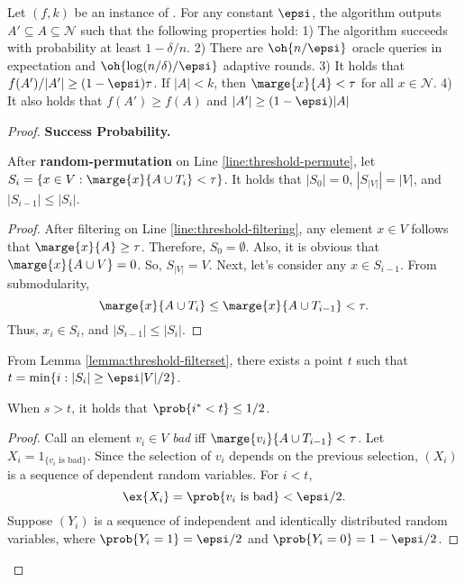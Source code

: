 \begin{theorem} \label{thm:threshold}
Let $(f,k)$ be an instance of \sm . For any constant $\epsi$, 
the algorithm \threshold outputs $A'\subseteq A \subseteq \mathcal{N}$ such that the following properties hold:
1) The algorithm succeeds with probability at least $1 - \delta/n$.
2) There are $\oh{n/\epsi}$ oracle queries in expectation and $\oh{\log (n/\delta)/\epsi}$ adaptive rounds.
3) It holds that $f(A')/|A'| \ge (1-\epsi) \tau$.
If $|A| < k$, then $\marge{x}{A} < \tau$ for all $x\in \mathcal{N}$.
4) It also holds that $f(A')\ge f(A)$ and $|A'|\ge (1-\epsi)|A|$
\end{theorem}
\begin{proof}
\textbf{Success Probability.}
\begin{lemma} \label{lemma:threshold-filterset}
	After \textbf{random-permutation} on Line \ref{line:threshold-permute},
	let $S_i=\{x \in V: \marge{x}{A\cup T_i} < \tau\}$.
	It holds that $|S_0|=0$, $|S_{|V|}|=|V|$, and $|S_{i-1}| \le |S_i|$.
\end{lemma}
\begin{proof}
	After filtering on Line \ref{line:threshold-filtering},
	any element $x \in V$ follows that $\marge{x}{A} \ge \tau$.
	Therefore, $S_0 = \emptyset$.
	Also, it is obvious that $\marge{x}{A\cup V}=0$.
	So, $S_{|V|} = V$.
	Next, let's consider any $x \in S_{i-1}$.
	From submodularity,
	$$\marge{x}{A \cup T_i} \le \marge{x}{A\cup T_{i-1}}< \tau.$$
	Thus, $x_i \in S_i$, and $|S_{i-1}| \le |S_i|$.
\end{proof}
From Lemma \ref{lemma:threshold-filterset},
there exists a point $t$ such that
$t = \min \{i: |S_i| \ge \epsi |V|/2\}$.
\begin{lemma} \label{lemma:threshold-prob1}
	When $s > t$, it holds that $\prob{i^*<t} \le 1/2$.
\end{lemma}
\begin{proof}
	Call an element $v_i \in V$ \textit{bad} iff
	$\marge{v_i}{A\cup T_{i-1}} < \tau$.
	Let $X_i=1_{\{v_i \text{ is bad}\}}$.
	Since the selection of $v_i$ depends on the previous selection,
	$(X_i)$ is a sequence of dependent random variables.
	For $i < t$, $$\ex{X_i}=\prob{v_i \text{ is bad}} <\epsi/2.$$
	Suppose $(Y_i)$ is a sequence of independent and identically distributed random variables,
	where $\prob{Y_i=1}=\epsi/2$ and $\prob{Y_i=0}=1-\epsi/2$.

	



\end{proof}
\end{proof}
